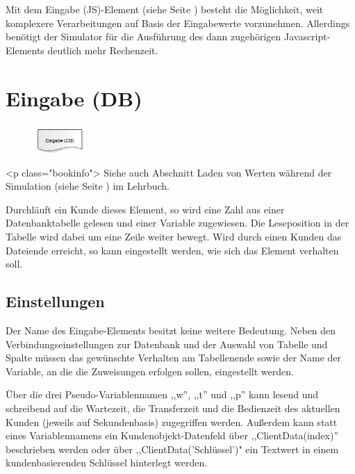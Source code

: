 Mit dem Eingabe (JS)-Element (siehe Seite \pageref{ref:ModelElementInputJS}) besteht die Möglichkeit, weit komplexere
Verarbeitungen auf Basis der Eingabewerte vorzunehmen. Allerdings benötigt der Simulator für die Ausführung
des dann zugehörigen Javascript-Elements deutlich mehr Rechenzeit.


\section{Eingabe (DB)}
\label{ref:ModelElementInputDB}

\begin{figure}
\vspace{-22pt}
\includegraphics[width=2cm]{imageModelElementInputDB.png}
\vspace{-22pt}
\end{figure}

<p class="bookinfo">
Siehe auch Abschnitt Laden von Werten während der Simulation (siehe Seite \pageref{ref:book:9.3.2}) im Lehrbuch.

Durchläuft ein Kunde dieses Element, so wird eine Zahl aus einer Datenbanktabelle gelesen und einer
Variable zugewiesen. Die Leseposition in der Tabelle wird dabei um eine Zeile weiter bewegt.
Wird durch einen Kunden das Dateiende erreicht, so kann eingestellt werden, wie sich
das Element verhalten soll.

\subsection*{Einstellungen}

Der Name des Eingabe-Elements besitzt keine weitere Bedeutung. Neben den Verbindungseinstellungen
zur Datenbank und der Auswahl von Tabelle und Spalte müssen das gewünschte Verhalten am Tabellenende
sowie der Name der Variable, an die die Zuweisungen erfolgen sollen, eingestellt werden.

Über die drei Pseudo-Variablennamen ,,w'', ,,t'' und ,,p'' kann lesend und schreibend auf die Wartezeit, die Transferzeit
und die Bedienzeit des aktuellen Kunden (jeweils auf Sekundenbasis) zugegriffen werden. Außerdem kann statt eines
Variablennamens ein Kundenobjekt-Datenfeld über ,,ClientData(index)'' beschrieben werden oder über ,,ClientData('Schlüssel')"
ein Textwert in einem kundenbasierenden Schlüssel hinterlegt werden.


